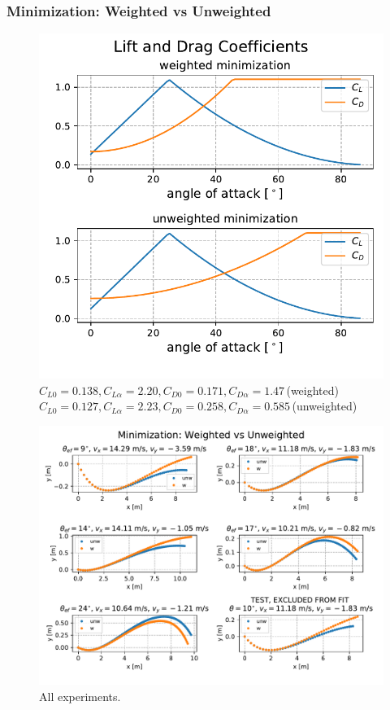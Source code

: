 \documentclass{beamer}
\begin{document}

\begin{frame}

\frametitle{Minimization: Weighted vs Unweighted }

\begin{figure}[H]
	\centering
	  \includegraphics[width=0.6 \textwidth]{cji_weighted_unweighted.pdf}
	  \captionsetup{justification=centering,margin=0cm}
	  \caption{$C_{L0} = 0.138, C_{L \alpha}= 2.20, C_{D0} = 0.171, C_{D \alpha} = 1.47 \,$(weighted) \\
	  $C_{L0} = 0.127, C_{L \alpha}= 2.23, C_{D0} = 0.258, C_{D \alpha} = 0.585 \,$(unweighted) }
\end{figure}

\end{frame}

\begin{frame}

\begin{figure}[H]
	\centering
	  \includegraphics[width= \textwidth]{traj_unweighted_weighted.pdf}
	  \captionsetup{justification=centering,margin=0cm}
	  \caption{All experiments.}
\end{figure}

\end{frame}
\end{document}
